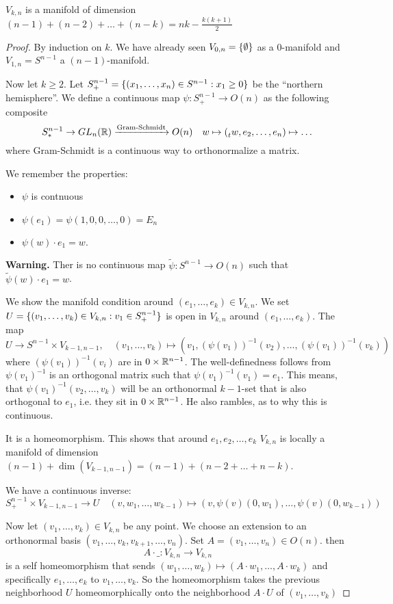 \documentclass[language=english]{TemplateLecture}
\begin{document}
\begin{proposition}
    \(V_{k,n}\) is a manifold of dimension \((n-1) + (n-2) + \dots + (n-k) = nk - \frac{k(k+1)}{2}\)
\end{proposition}
\begin{proof}
    By induction on \(k\). We have already seen \(V_{0,n} = \{\emptyset\} \) as a \(0\)-manifold and \(V_{1,n} = S^{n-1}\) a \((n-1)\)-manifold.

    Now let \(k \geq 2\). Let \(S^{n-1}_+ = \{(x_1, \dots, x_n) \in S^{n-1} : x_1 \geq 0\}\) be the \enquote{northern hemisphere}. We define a continuous map \(\psi \colon S^{n-1}_+ \to O(n)\) as the following composite
    \[S^{n-1}_* \to GL_n(\mathbb{R}) \xrightarrow{\text{Gram-Schmidt}} O(n) \quad w \mapsto (\prescript{}{t}{w}, e_2, \dots, e_n) \mapsto \dots\]
    where Gram-Schmidt is a continuous way to orthonormalize a matrix.

    We remember the properties:
    \begin{itemize}
        \item \(\psi\) is contnuous
        \item \(\psi(e_1) = \psi(1,0,0,\dots, 0) = E_n\)
        \item \(\psi(w) \cdot e_1 = w\).
    \end{itemize}

    \textbf{Warning.} Ther is no continuous map \(\tilde \psi \colon S^{n-1} \to O(n)\) such that \(\tilde \psi (w) \cdot e_1 = w\).

    We show the manifold condition around \((e_1, \dots, e_k) \in V_{k,n}\). We set \(U = \{(v_1, \dots, v_k) \in V_{k,n} : v_1 \in S^{n-1}_+\}\) is open in \(V_{k,n}\) around \((e_1, \dots, e_k)\). The map
    \[U \to S^{n-1} \times V_{k-1, n-1}, \quad (v_1, \dots, v_k) \mapsto (v_1, (\psi(v_1))^{-1}(v_2), \dots, (\psi(v_1))^{-1}(v_k))\]
    where \((\psi(v_1))^{-1}(v_i)\) are in \(0 \times \mathbb{R}^{n-1}\). The well-definedness follows from \(\psi(v_1)^{-1}\) is an orthogonal matrix such that \(\psi(v_1)^{-1}(v_1) = e_1\). This means, that \(\psi(v_1)^{-1}(v_2, \dots, v_k)\) will be an orthonormal \(k-1\)-set that is also orthogonal to \(e_1\), i.e. they sit in \(0 \times \mathbb{R}^{n-1}\). He also rambles, as to why this is continuous.

    It is a homeomorphism. This shows that around \(e_1, e_2, \dots, e_k\) \(V_{k,n}\) is locally a manifold of dimension \((n-1) + \dim (V_{k-1,n-1}) = (n-1) + (n-2 + \dots + n-k)\).

    We have a continuous inverse:
    \[S^{n-1}_+ \times V_{k-1, n-1} \to U \quad (v, w_1, \dots, w_{k-1}) \mapsto (v, \psi(v)(0,w_1), \dots, \psi(v)(0,w_{k-1}))\]

    Now let \((v_1, \dots, v_k) \in V_{k,n}\) be any point. We choose an extension to an orthonormal basis \((v_1, \dots, v_k, v_{k+1} , \dots, v_n)\). Set \(A = (v_1, \dots, v_n) \in O(n)\). then
    \[A \cdot \_\colon V_{k,n} \to V_{k,n}\]
    is a self homeomorphism that sends \((w_1, \dots, w_k) \mapsto (A \cdot w_1, \dots, A \cdot w_k)\) and specifically \(e_1, \dots, e_k\) to \(v_1, \dots, v_k\). So the homeomorphism takes the previous neighborhood \(U\) homeomorphically onto the neighborhood \(A \cdot U\) of \((v_1, \dots, v_k)\)
\end{proof}
\end{document}
